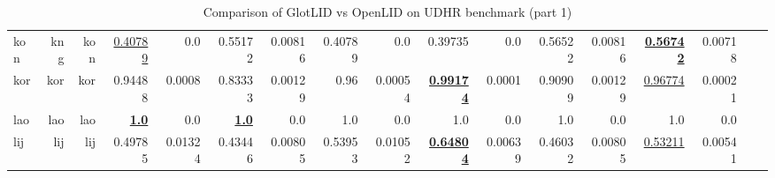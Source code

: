\documentclass[11pt]{article}
\def\udhr{UDHR\xspace}
\def\edin{OpenLID\xspace}
\begin{document}
\begin{table*}[h]
{\begin{tabular}{lrrrrrrrrrrrrrrrr}
kon         & kng         & kon         & \underline{0.40789}         & 0.0         & 0.55172         & 0.00816         & 0.40789         & 0.0         & 0.39735         & 0.0         & 0.56522         & 0.00816         & \textbf{\underline{0.56742}}         & 0.00718         \\
kor         & kor         & kor         & 0.94488         & 0.0008         & 0.83333         & 0.00129         & 0.96         & 0.00054         & \textbf{\underline{0.99174}}         & 0.0001         & 0.90909         & 0.00129         & \underline{0.96774}         & 0.00021         \\
lao         & lao         & lao         & \textbf{\underline{1.0}}         & 0.0         & \textbf{\underline{1.0}}         & 0.0         & 1.0         & 0.0         & 1.0         & 0.0         & 1.0         & 0.0         & 1.0         & 0.0         \\
lij         & lij         & lij         & 0.49785         & 0.01324         & 0.43446         & 0.00805         & 0.53953         & 0.01052         & \textbf{\underline{0.64804}}         & 0.00639         & 0.46032         & 0.00805         & \underline{0.53211}         & 0.00541         \\
\end{tabular}
}
\caption{Comparison of GlotLID vs \edin on \udhr benchmark (part 1)}
\label{tab:appendix_glotlid_lid201_udhr_1}
\end{table*}
\end{document}
